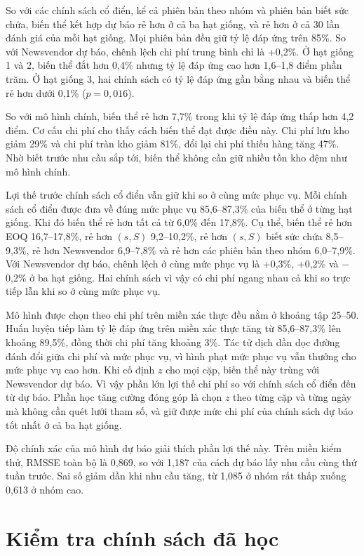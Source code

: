 So với các chính sách cổ điển, kể cả phiên bản theo nhóm và phiên bản biết sức chứa, biến thể kết hợp dự báo rẻ hơn ở cả ba hạt giống, và rẻ hơn ở cả 30 lần đánh giá của mỗi hạt giống. Mọi phiên bản đều giữ tỷ lệ đáp ứng trên 85\%. So với Newsvendor dự báo, chênh lệch chi phí trung bình chỉ là +0,2\%. Ở hạt giống 1 và 2, biến thể đắt hơn 0,4\% nhưng tỷ lệ đáp ứng cao hơn 1,6--1,8 điểm phần trăm. Ở hạt giống 3, hai chính sách có tỷ lệ đáp ứng gần bằng nhau và biến thể rẻ hơn dưới 0,1\% ($p = 0{,}016$).

So với mô hình chính, biến thể rẻ hơn 7,7\% trong khi tỷ lệ đáp ứng thấp hơn 4,2 điểm. Cơ cấu chi phí cho thấy cách biến thể đạt được điều này. Chi phí lưu kho giảm 29\% và chi phí tràn kho giảm 81\%, đổi lại chi phí thiếu hàng tăng 47\%. Nhờ biết trước nhu cầu sắp tới, biến thể không cần giữ nhiều tồn kho đệm như mô hình chính.

Lợi thế trước chính sách cổ điển vẫn giữ khi so ở cùng mức phục vụ. Mỗi chính sách cổ điển được đưa về đúng mức phục vụ 85,6--87,3\% của biến thể ở từng hạt giống. Khi đó biến thể rẻ hơn tất cả từ 6,0\% đến 17,8\%. Cụ thể, biến thể rẻ hơn EOQ 16,7--17,8\%, rẻ hơn $(s,S)$ 9,2--10,2\%, rẻ hơn $(s,S)$ biết sức chứa 8,5--9,3\%, rẻ hơn Newsvendor 6,9--7,8\% và rẻ hơn các phiên bản theo nhóm 6,0--7,9\%. Với Newsvendor dự báo, chênh lệch ở cùng mức phục vụ là +0,3\%, +0,2\% và $-$0,2\% ở ba hạt giống. Hai chính sách vì vậy có chi phí ngang nhau cả khi so trực tiếp lẫn khi so ở cùng mức phục vụ.

Mô hình được chọn theo chi phí trên miền xác thực đều nằm ở khoảng tập 25--50. Huấn luyện tiếp làm tỷ lệ đáp ứng trên miền xác thực tăng từ 85,6--87,3\% lên khoảng 89,5\%, đồng thời chi phí tăng khoảng 3\%. Tác tử dịch dần dọc đường đánh đổi giữa chi phí và mức phục vụ, vì hình phạt mức phục vụ vẫn thưởng cho mức phục vụ cao hơn. Khi cố định $z$ cho mọi cặp, biến thể này trùng với Newsvendor dự báo. Vì vậy phần lớn lợi thế chi phí so với chính sách cổ điển đến từ dự báo. Phần học tăng cường đóng góp là chọn $z$ theo từng cặp và từng ngày mà không cần quét lưới tham số, và giữ được mức chi phí của chính sách dự báo tốt nhất ở cả ba hạt giống.

Độ chính xác của mô hình dự báo giải thích phần lợi thế này. Trên miền kiểm thử, RMSSE toàn bộ là 0,869, so với 1,187 của cách dự báo lấy nhu cầu cùng thứ tuần trước. Sai số giảm dần khi nhu cầu tăng, từ 1,085 ở nhóm rất thấp xuống 0,613 ở nhóm cao.

\section{Kiểm tra chính sách đã học}
\label{sec:phanTich}

